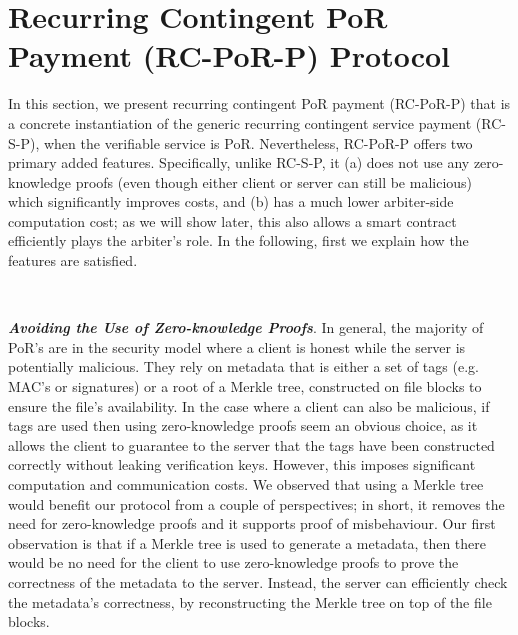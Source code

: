 
\section{Recurring Contingent PoR Payment (RC-PoR-P) Protocol}


In this section, we present recurring contingent PoR payment (RC-PoR-P) that is a concrete instantiation of the generic recurring contingent service payment (RC-S-P), when the verifiable service is PoR. Nevertheless, RC-PoR-P offers  two primary added features. Specifically, unlike RC-S-P, it (a) does not use any zero-knowledge proofs (even though either client or server can still be  malicious) which significantly improves  costs, and (b)  has a much lower  arbiter-side computation cost; as we will show later, this also allows a smart contract efficiently plays the arbiter's role. In the following, first we  explain how the features are satisfied.

\

\noindent\textit{\textbf{Avoiding the Use of Zero-knowledge Proofs}}. In general, the majority of  PoR's are in the security model where a client is honest while the server is potentially malicious. They rely on metadata that is either a set of tags (e.g. MAC's or signatures) or a root of a Merkle tree,  constructed on  file blocks to ensure the file's availability. In the case where a client can also  be malicious,  if tags are used then using zero-knowledge proofs seem  an obvious choice, as it allows the client to guarantee to the server that the tags have been constructed correctly without leaking verification keys. However, this imposes significant computation and communication costs. We observed that using a Merkle tree would benefit our protocol from a couple of perspectives; in short, it removes the need for zero-knowledge proofs and it supports proof of misbehaviour. Our first observation is that if a Merkle tree is used to generate a metadata, then   there would be no need for the client to use zero-knowledge proofs to prove the correctness of the metadata to the server. Instead, the server can efficiently check the metadata's correctness, by reconstructing the Merkle tree on top of the file blocks. 

\


